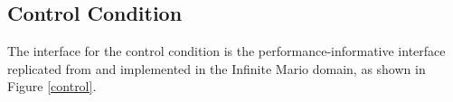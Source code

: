 \subsection{Control Condition} 
The interface for the control condition is the performance-informative interface replicated from \cite{li2016using} and implemented in the Infinite %
Mario domain, as shown in Figure \ref{control}. %



